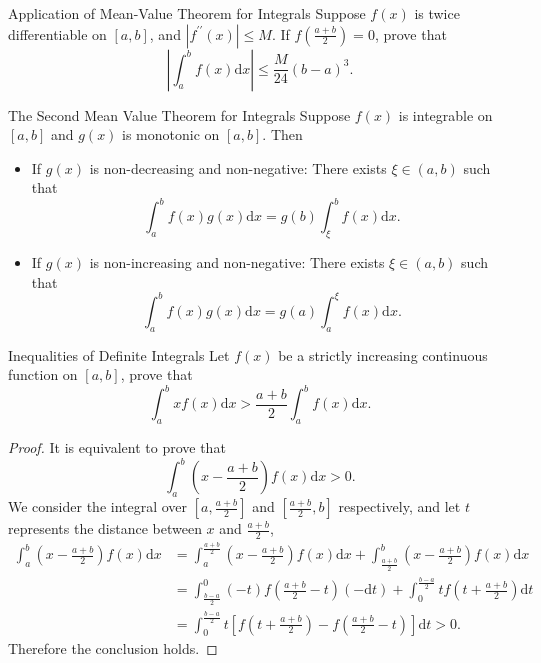 \begin{example}{Application of Mean-Value Theorem for Integrals}{}
  Suppose $f(x)$ is twice differentiable on $[a, b]$,
  and $|f^{\prime\prime}(x)| \leq M$.
  If $f(\frac{a+b}{2}) = 0$, prove that
  \begin{equation}
    \left| \int_a^b f(x)\mathrm{d} x \right| \leq \frac{M}{24}(b - a)^3.
  \end{equation}
\end{example}

\begin{theorem}{The Second Mean Value Theorem for Integrals}{}
  Suppose $f(x)$ is integrable on $[a, b]$ and $g(x)$ is monotonic on $[a, b]$.
  Then 
  \begin{itemize}
  \item If $g(x)$ is non-decreasing and non-negative: There exists $\xi \in (a,
    b)$ such that
    \begin{equation}
      \int_a^b f(x) g(x) \mathrm{d} x = g(b) \int_{\xi}^b f(x) \mathrm{d} x.
    \end{equation}
  \item If $g(x)$ is non-increasing and non-negative: There exists $\xi \in (a,
    b)$ such that
    \begin{equation}
      \int_a^b f(x) g(x) \mathrm{d} x = g(a) \int_{a}^{\xi} f(x) \mathrm{d} x.
    \end{equation}
  \end{itemize}
\end{theorem}

\begin{example}{Inequalities of Definite Integrals}{}
  Let $f(x)$ be a strictly increasing continuous function on $[a, b]$,
  prove that
  \begin{equation}
    \int _a^b x f(x)\mathrm{d} x > \frac{a+b}{2} \int_a^b f(x)\mathrm{d} x.
  \end{equation}
\end{example}

\begin{proof}
  It is equivalent to prove that
  \begin{equation}
    \int_a^b \left( x - \frac{a+b}{2} \right) f(x)\mathrm{d} x > 0.
  \end{equation}
  We consider the integral over $[a, \frac{a+b}{2}]$ and $[\frac{a+b}{2}, b]$ respectively,
  and let $t$ represents the distance between $x$ and $\frac{a+b}{2}$,
  \begin{align}
    \int_a^b \left( x - \frac{a+b}{2} \right)f(x)\mathrm{d} x
    &=  \int_a^{\frac{a+b}{2}} \left( x - \frac{a+b}{2} \right) f(x)\mathrm{d} x + \int_{\frac{a+b}{2}}^b \left( x - \frac{a+b}{2} \right) f(x)\mathrm{d} x\\
    &= \int_{\frac{b-a}{2}}^0 (-t) f(\frac{a+b}{2} - t)(-\mathrm{d} t) + \int_0^{\frac{b-a}{2}} tf(t + \frac{a+b}{2})\mathrm{d} t\\
    &= \int _0^{\frac{b-a}{2}} t \left[ f(t + \frac{a+b}{2}) - f(\frac{a+b}{2} - t) \right]\mathrm{d} t > 0.
  \end{align}
  Therefore the conclusion holds.
\end{proof}

